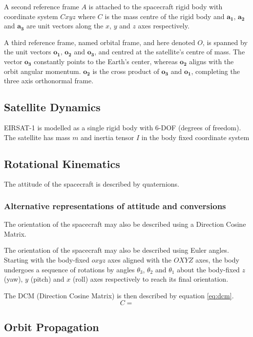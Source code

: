 A second reference frame $A$ is attached to the spacecraft rigid body with coordinate system $Cxyz$ where $C$ is the mass centre of the rigid body and $\mathbf{a_1}$, $\mathbf{a_2}$ and $\mathbf{a_3}$ are unit vectors along the $x$, $y$ and $z$ axes respectively.

A third reference frame, named orbital frame, and here denoted $O$, is spanned by the unit vectors $\mathbf{o_1}$, $\mathbf{o_2}$ and $\mathbf{o_3}$, and centred at the satellite's centre of mass. The vector $\mathbf{o_3}$ constantly points to the Earth's center, whereas $\mathbf{o_2}$ aligns with the orbit angular momentum. $\mathbf{o_2}$ is the cross product of $\mathbf{o_3}$ and $\mathbf{o_1}$, completing the three axis orthonormal frame.

\subsection{Satellite Dynamics}

EIRSAT-1 is modelled as a single rigid body with 6-DOF (degrees of freedom).
The satellite has mass $m$ and inertia tensor $I$ in the body fixed coordinate system

\subsection{Rotational Kinematics}

The attitude of the spacecraft is described by quaternions.

\subsubsection{Alternative representations of attitude and conversions}
The orientation of the spacecraft may also be described using a Direction Cosine Matrix.

The orientation of the spacecraft may also be described using Euler angles.
Starting with the body-fixed $oxyz$ axes aligned with the $OXYZ$ axes, the body undergoes a sequence of rotations by angles $\theta_3$, $\theta_2$ and $\theta_1$ about the body-fixed $z$ (yaw), $y$ (pitch) and $x$ (roll) axes respectively to reach its final orientation.

The DCM (Direction Cosine Matrix) is then described by equation \ref{eq:dcm}.
\begin{equation} \label{eq:dcm}
C = 
\end{equation}

\subsection{Orbit Propagation}

